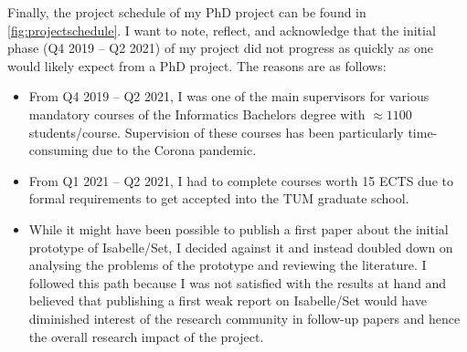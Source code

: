 \documentclass[a4paper, 12pt]{article}
\theoremstyle{plain}
\theoremstyle{definition}
\begin{document}
Finally, the project schedule of my PhD project can be found in \cref{fig:projectschedule}.
I want to note, reflect, and acknowledge that
the initial phase (Q4 2019 -- Q2 2021) of my project
did not progress as quickly as one would likely expect from a PhD project.
The reasons are as follows:
\begin{itemize}
  \item From Q4 2019 -- Q2 2021, I was one of the main supervisors for various mandatory courses of the Informatics Bachelors degree with $\approx 1100$ students/course.
    Supervision of these courses has been particularly time-consuming due to the Corona pandemic.
  \item From Q1 2021 -- Q2 2021, I had to complete courses worth 15 ECTS due to formal requirements to get accepted into the TUM graduate school.
  \item While it might have been possible to publish a first paper about the initial prototype of Isabelle/Set,
    I decided against it and instead doubled down on analysing the problems of the prototype
    and reviewing the literature.
    I followed this path because I was not satisfied with the results at hand and believed that publishing a first weak report on Isabelle/Set would have diminished interest of the research community in follow-up papers and hence the overall research impact of the project.
\end{itemize}

\newpage
\end{document}
